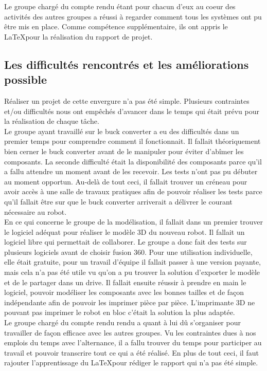 \documentclass{PackagerQualityN}
\begin{document}
Le groupe chargé du compte rendu étant pour chacun d'eux au coeur des activités des autres groupes a réussi à regarder comment tous les systèmes ont pu être mis en place. Comme compétence supplémentaire, ils ont appris le \LaTeX pour la réalisation du rapport de projet.

\subsection{Les difficultés rencontrés et les améliorations possible}

Réaliser un projet de cette envergure n’a pas été simple. Plusieurs contraintes et/ou difficultés nous ont empêchés d’avancer dans le temps qui était prévu pour la réalisation de chaque tâche.\\

Le groupe ayant travaillé sur le buck converter a eu des difficultés dans un premier temps pour comprendre comment il fonctionnait. Il fallait théoriquement bien cerner le buck converter avant de le manipuler pour éviter d’abîmer les composants. 
La seconde difficulté était la disponibilité des composants parce qu’il a fallu attendre un moment avant de les recevoir. Les tests n’ont pas pu débuter au moment opportun.
Au-delà de tout ceci, il fallait trouver un créneau pour avoir accès à une salle de travaux pratiques afin de pouvoir réaliser les tests parce qu’il fallait être sur que le buck converter arriverait a délivrer le courant nécessaire au robot.\\

En ce qui concerne le groupe de la modélisation, il fallait dans un premier trouver le logiciel adéquat pour réaliser le modèle 3D du nouveau robot. Il fallait un logiciel libre qui permettait de collaborer. Le groupe a donc fait des tests sur plusieurs logiciels avant de choisir fusion 360. Pour une utilisation individuelle, elle était gratuite, pour un travail d'équipe il fallait passer à une version payante, mais cela n'a pas été utile vu qu'on a pu trouver la solution d'exporter le modèle et de le partager dans un drive.
Il fallait ensuite réussir à prendre en main le logiciel, pouvoir modéliser les composants avec les bonnes tailles et de façon indépendante afin de pouvoir les imprimer pièce par pièce. L'imprimante 3D ne pouvant pas imprimer le robot en bloc c'était la solution la plus adaptée.\\

Le groupe chargé du compte rendu rendu a quant à lui dû s'organiser pour travailler de façon efficace avec les autres groupes. Vu les contraintes dues à nos emplois du temps avec l'alternance, il a fallu trouver du temps pour participer au travail et pouvoir transcrire tout ce qui a été réalisé. En plus de tout ceci, il faut rajouter l'apprentissage du \LaTeX pour rédiger le rapport qui n'a pas été simple.\\
\end{document}
